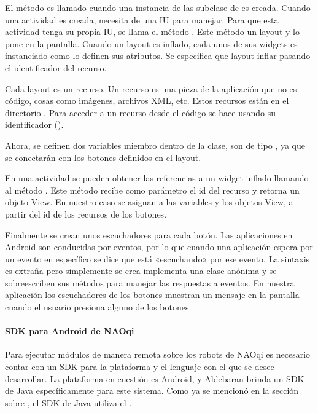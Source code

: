 El método  es llamado cuando una instancia de las subclase
de  es creada. Cuando una actividad es creada, necesita de una IU para
manejar. Para que esta actividad tenga su propia IU, se llama el método
. Este método  un layout y lo pone en la pantalla.
Cuando un layout es inflado, cada unos de sus widgets es instanciado como
lo definen sus atributos. Se especifica que layout inflar pasando el identificador
del recurso.

Cada layout es un recurso. Un recurso es una pieza de la aplicación que no es
código, cosas como imágenes, archivos XML, etc. Estos recursos están en
el directorio . Para acceder a un recurso desde el código se hace
usando su identificador ().

Ahora, se definen dos variables miembro dentro de la clase, son de tipo
, ya que se conectarán con los botones definidos en el layout.

En una actividad se pueden obtener las referencias a un widget inflado llamando
al método . Este método recibe como parámetro el id del recurso
y retorna un objeto View. En nuestro caso se asignan a las variables
 y  los objetos View, a partir del id
de los recursos de los botones.

Finalmente se crean unos escuchadores para cada botón. Las aplicaciones en
Android son conducidas por eventos, por lo que cuando una aplicación espera
por un evento en específico se dice que está «escuchando» por ese evento. La
sintaxis es extraña pero simplemente se crea implementa una clase anónima
y se sobreescriben sus métodos para manejar las respuestas a eventos. En nuestra
aplicación los escuchadores de los botones muestran un mensaje en la pantalla
cuando el usuario presiona alguno de los botones.


\paragraph{SDK para Android de NAOqi}
\label{\detokenize{dev_docs:sdk-para-android-de-naoqi}}
Para ejecutar módulos de manera remota sobre los robots de NAOqi es necesario
contar con un SDK para la plataforma y el lenguaje con el que se desee
desarrollar. La plataforma en cuestión es Android, y Aldebaran brinda un SDK
de Java específicamente para este sistema. Como ya se mencionó en la sección
sobre , el SDK de Java utiliza el .

